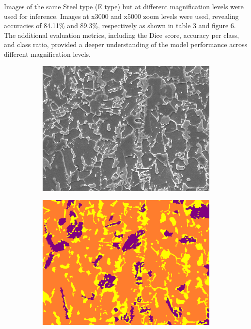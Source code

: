 \documentclass[]{article}
\begin{document}
Images of the same Steel type (E type) but at different magnification levels were used for inference. Images at x3000 and x5000 zoom levels were used, revealing accuracies of 84.11\% and 89.3\%, respectively as shown in table 3 and figure 6. The additional evaluation metrics, including the Dice score, accuracy per class, and class ratio, provided a deeper understanding of the model performance across different magnification levels. 
\begin{figure}[ht]
	\centering
	
	\begin{subfigure}[b]{0.3\textwidth}
		\centering
		\includegraphics[width=\textwidth]{images/inference/SameSteelDiffMag-O.jpg}
		\caption{}
		\label{fig:samesteeldiffmag3K-orig}
	\end{subfigure}
	\hfill
	\begin{subfigure}[b]{0.3\textwidth}
		\centering
		\includegraphics[width=\textwidth]{images/inference/SameSteelDiffMag-L.png}

\end{subfigure}
\end{figure}
\end{document}
